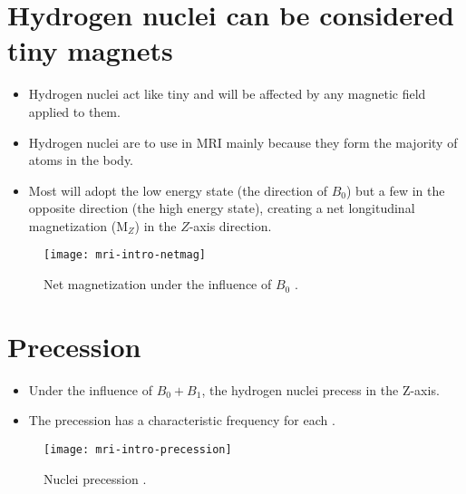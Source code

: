 \section{Hydrogen nuclei can be considered tiny magnets}
\begin{itemize}
\item Hydrogen nuclei act like tiny  and will be affected by any magnetic field
  applied to them.
\item Hydrogen nuclei are  to use in \gls{MRI} mainly because they form the
  majority of atoms in the body.
\item Most will adopt the low energy state (the direction of $B_0$)
  but a few in the opposite direction (the high energy state),
  creating a net longitudinal magnetization (M$_Z$) in the $Z$-axis
  direction.
\end{itemize}
\vspace{-4ex}
\begin{figure}[!b]
  \centering
  \texttt{[image: mri-intro-netmag]}
  \caption{Net magnetization under the influence of $B_0$ \cite{abdulla2025MRI_intro}.}
  \label{fig:MRI-intro-netmag}
\end{figure}

\section{Precession}
\begin{itemize}
\item Under the influence of $B_0+B_1$, the hydrogen nuclei precess in the Z-axis.
\item The precession has a characteristic 
  frequency for each .
\end{itemize}
\vspace{-4ex}
\begin{figure}[!b]
  \centering
  \texttt{[image: mri-intro-precession]}
  \caption{Nuclei precession \cite{abdulla2025MRI_intro}.}
  \label{fig:MRI-intro-precession}
\end{figure}

